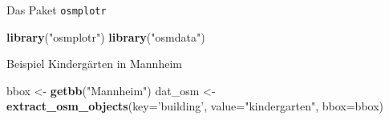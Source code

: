 \documentclass[ignorenonframetext,]{beamer}
\newenvironment{Shaded}{\begin{snugshade}}{\end{snugshade}}
\newcommand{\DataTypeTok}[1]{\textcolor[rgb]{0.13,0.29,0.53}{#1}}
\newcommand{\KeywordTok}[1]{\textcolor[rgb]{0.13,0.29,0.53}{\textbf{#1}}}
\newcommand{\NormalTok}[1]{#1}
\newcommand{\StringTok}[1]{\textcolor[rgb]{0.31,0.60,0.02}{#1}}
\begin{document}
\begin{frame}[fragile]{Das Paket \texttt{osmplotr}}
\protect\hypertarget{das-paket-osmplotr}{}

\begin{Shaded}
\begin{Highlighting}[]
\KeywordTok{library}\NormalTok{(}\StringTok{"osmplotr"}\NormalTok{)}
\KeywordTok{library}\NormalTok{(}\StringTok{"osmdata"}\NormalTok{)}
\end{Highlighting}
\end{Shaded}

\end{frame}

\begin{frame}[fragile]{Beispiel Kindergärten in Mannheim}
\protect\hypertarget{beispiel-kindergarten-in-mannheim}{}

\begin{Shaded}
\begin{Highlighting}[]
\NormalTok{bbox <-}\StringTok{ }\KeywordTok{getbb}\NormalTok{(}\StringTok{"Mannheim"}\NormalTok{)}
\NormalTok{dat_osm <-}\StringTok{ }\KeywordTok{extract_osm_objects}\NormalTok{(}\DataTypeTok{key=}\StringTok{'building'}\NormalTok{, }
                              \DataTypeTok{value=}\StringTok{"kindergarten"}\NormalTok{,}
                              \DataTypeTok{bbox=}\NormalTok{bbox)}
\end{Highlighting}
\end{Shaded}

\end{frame}
\end{document}
